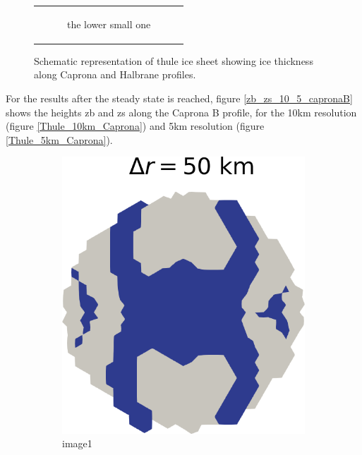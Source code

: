 \documentclass{article}
\begin{document}
\begin{figure}[!h]
\begin{tabular}[c]{@{}c@{}}
\begin{subfigure}[c]{.48\linewidth}
      \caption
        {%
          the lower small one%
          \label{fig:lower}%
        }%
    \end{subfigure}
  \end{tabular}
  \caption
    {%
      Schematic representation of thule ice sheet showing ice thickness along Caprona and Halbrane profiles.%
      \label{fig:every}%
    }
\end{figure}

For the results after the steady state is reached, figure \ref{zb_zs_10_5_capronaB} shows the heights zb and zs along the Caprona B profile, for the 10km resolution (figure \ref{Thule_10km_Caprona}) and 5km resolution (figure \ref{Thule_5km_Caprona}).

\begin{figure}[!h]
	\centering %
	\begin{subfigure}{0.25\textwidth}
		\includegraphics[width=\linewidth]{../fig/Grounded_zone_50km.png}
		\caption{image1}
		\label{fig:1}
	\end{subfigure}\hfil %
	\begin{subfigure}{0.25\textwidth}

\end{subfigure}
\end{figure}
\end{document}
